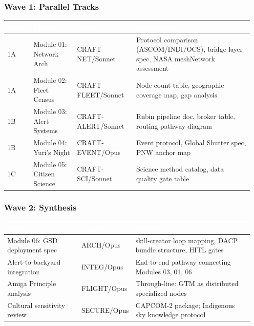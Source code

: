 \documentclass[11pt,letterpaper]{article}
\newcommand{\tableheader}[1]{\textbf{\sffamily\textcolor{white}{#1}}}
\begin{document}
\subsubsection{Wave 1: Parallel Tracks}

\begin{center}
\begin{tabularx}{\textwidth}{L{2cm}L{4cm}L{2cm}X}
\toprule
{}
\tableheader{Track} & \tableheader{Module} & \tableheader{Agent} & \tableheader{Key Outputs} \\
\midrule
1A & Module 01: Network Arch & CRAFT-NET/Sonnet & Protocol comparison (ASCOM/INDI/OCS), bridge layer spec, NASA meshNetwork assessment \\
1A & Module 02: Fleet Census & CRAFT-FLEET/Sonnet & Node count table, geographic coverage map, gap analysis \\
1B & Module 03: Alert Systems & CRAFT-ALERT/Sonnet & Rubin pipeline doc, broker table, routing pathway diagram \\
1B & Module 04: Yuri's Night & CRAFT-EVENT/Opus & Event protocol, Global Shutter spec, PNW anchor map \\
1C & Module 05: Citizen Science & CRAFT-SCI/Sonnet & Science method catalog, data quality gate table \\
\bottomrule
\end{tabularx}
\end{center}

\subsubsection{Wave 2: Synthesis}

\begin{center}
\begin{tabularx}{\textwidth}{L{4cm}L{2cm}X}
\toprule
{}
\tableheader{Task} & \tableheader{Agent} & \tableheader{Output} \\
\midrule
Module 06: GSD deployment spec & ARCH/Opus & skill-creator loop mapping, DACP bundle structure, HITL gates \\
Alert-to-backyard integration & INTEG/Opus & End-to-end pathway connecting Modules 03, 01, 06 \\
Amiga Principle analysis & FLIGHT/Opus & Through-line: GTM as distributed specialized nodes \\
Cultural sensitivity review & SECURE/Opus & CAPCOM-2 package; Indigenous sky knowledge protocol \\
\bottomrule
\end{tabularx}
\end{center}
\end{document}
